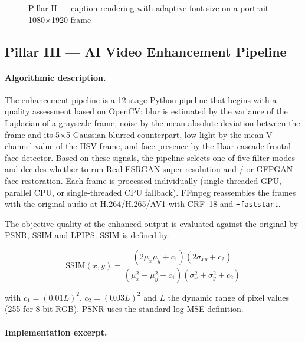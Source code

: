 \begin{figure}[H]
\centering
{}
\caption{Pillar II --- caption rendering with adaptive font size on a portrait 1080$\times$1920 frame}
\label{fig:caption_preview}
\end{figure}

\subsection{Pillar III --- AI Video Enhancement Pipeline}
\label{sec:pillar3}

\paragraph{Algorithmic description.}
The enhancement pipeline is a 12-stage Python pipeline that begins with a quality assessment
based on OpenCV: blur is estimated by the variance of the Laplacian of a grayscale frame,
noise by the mean absolute deviation between the frame and its 5$\times$5 Gaussian-blurred
counterpart, low-light by the mean V-channel value of the HSV frame, and face presence by
the Haar cascade frontal-face detector. Based on these signals, the pipeline selects one of
five filter modes and decides whether to run Real-ESRGAN super-resolution and / or GFPGAN
face restoration. Each frame is processed individually (single-threaded GPU, parallel CPU,
or single-threaded CPU fallback). FFmpeg reassembles the frames with the original audio at
H.264/H.265/AV1 with CRF~18 and \texttt{+faststart}.

The objective quality of the enhanced output is evaluated against the original by PSNR,
SSIM and LPIPS. SSIM is defined by:

\begin{equation}
\mathrm{SSIM}(x,y) =
\frac{(2\mu_x\mu_y + c_1)(2\sigma_{xy} + c_2)}
     {(\mu_x^{2} + \mu_y^{2} + c_1)(\sigma_x^{2} + \sigma_y^{2} + c_2)}
\label{eq:ssim}
\end{equation}

with $c_1 = (0.01 L)^2$, $c_2 = (0.03 L)^2$ and $L$ the dynamic range of pixel values (255
for 8-bit RGB). PSNR uses the standard log-MSE definition.

\paragraph{Implementation excerpt.}

